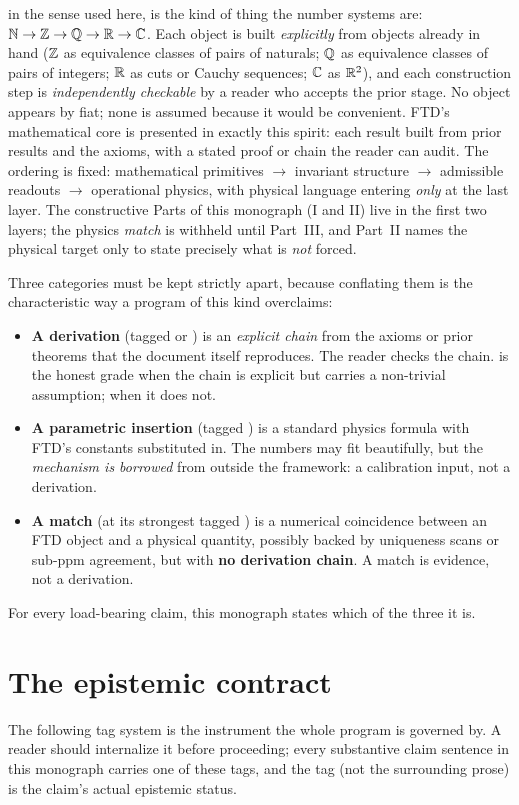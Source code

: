  in the sense used here, is the kind of thing the number
systems are: $\mathbb{N}\to\mathbb{Z}\to\mathbb{Q}\to\mathbb{R}\to\mathbb{C}$. Each object is built \emph{explicitly}
from objects already in hand ($\mathbb{Z}$ as equivalence classes of pairs of naturals;
$\mathbb{Q}$ as equivalence classes of pairs of integers; $\mathbb{R}$ as cuts or Cauchy
sequences; $\mathbb{C}$ as $\mathbb{R}^2$), and each construction step is \emph{independently
checkable} by a reader who accepts the prior stage. No object appears by fiat;
none is assumed because it would be convenient. FTD's mathematical core is
presented in exactly this spirit: each result built from prior results and
the axioms, with a stated proof or chain the reader can audit. The ordering is
fixed: mathematical primitives $\to$ invariant structure $\to$ admissible
readouts $\to$ operational physics, with physical language entering \emph{only}
at the last layer. The constructive Parts of this monograph (I and II) live in
the first two layers; the physics \emph{match} is withheld until Part~III, and
Part~II names the physical target only to state precisely what is \emph{not}
forced.

\medskip
\noindent Three categories must be kept strictly apart, because conflating them
is the characteristic way a program of this kind overclaims:
\begin{itemize}[leftmargin=1.4em, itemsep=4pt]
  \item \textbf{A derivation} (tagged  or ) is an
        \emph{explicit chain} from the axioms or prior theorems that the
        document itself reproduces. The reader checks the chain.  is
        the honest grade when the chain is explicit but carries a non-trivial
        assumption;  when it does not.
  \item \textbf{A parametric insertion} (tagged ) is a
        standard physics formula with FTD's constants substituted in. The
        numbers may fit beautifully, but the \emph{mechanism is borrowed} from
        outside the framework: a calibration input, not a derivation.
  \item \textbf{A match} (at its strongest tagged ) is a
        numerical coincidence between an FTD object and a physical quantity,
        possibly backed by uniqueness scans or sub-ppm agreement, but with
        \textbf{no derivation chain}. A match is evidence, not a derivation.
\end{itemize}
For every load-bearing claim, this monograph states which of the three it is.

\section{The epistemic contract}\label{sec:contract}
The following tag system is the instrument the whole program is governed by. A
reader should internalize it before proceeding; every substantive claim
sentence in this monograph carries one of these tags, and the tag (not the
surrounding prose) is the claim's actual epistemic status.

